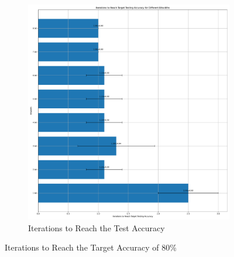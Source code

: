 \begin{figure}[H]
\begin{subfigure}[H]{0.48\textwidth}
                \includegraphics[width=\textwidth]{../standard/FashionMNIST/plots/fashionmnist_test_iters.pdf}
                \caption{Iterations to Reach the Test Accuracy}
            \end{subfigure}
            \caption{Iterations to Reach the Target Accuracy of 80\%}
        \end{figure}

